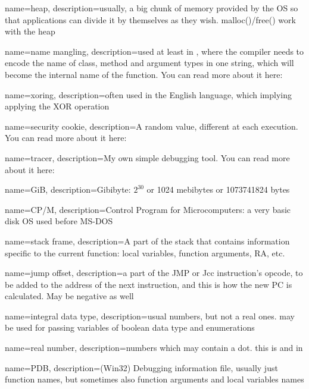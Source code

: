 {
  name=heap,
  description={usually, a big chunk of memory provided by the \ac{OS} so that applications can divide it by themselves as they wish.
  malloc()/free() work with the heap}
}

{
  name=name mangling,
  description={used at least in \Cpp, where the compiler needs to encode the name of class, method and argument types in one string,
  which will become the internal name of the function. You can read more about it here: }
}

{
  name=xoring,
  description={often used in the English language, which implying applying the \ac{XOR} operation}
}

{
  name=security cookie,
  description={A random value, different at each execution. You can read more about it here:
  }
}

{
  name=tracer,
  description={My own simple debugging tool. You can read more about it here: }
}

{
  name=GiB,
  description={Gibibyte: $2^{30}$ or 1024 mebibytes or 1073741824 bytes}
}

{
  name=CP/M,
  description={Control Program for Microcomputers: a very basic disk \ac{OS} used before MS-DOS}
}

{
  name=stack frame,
  description={A part of the stack that contains information specific to the current function:
  local variables, function arguments, \ac{RA}, etc.}
}

{
  name=jump offset,
  description={a part of the JMP or Jcc instruction's opcode, 
  to be added to the address
  of the next instruction, and this is how the new \ac{PC} is calculated. May be negative as well}
}

{
  name=integral data type,
  description={usual numbers, but not a real ones. may be used for passing variables of boolean data type and enumerations}
}

{
  name={real number},
  description={numbers which may contain a dot. this is \Tfloat and \Tdouble in \CCpp}
}

{
  name=PDB,
  description={(Win32) Debugging information file, usually just function names, but sometimes also function
  arguments and local variables names}
}

